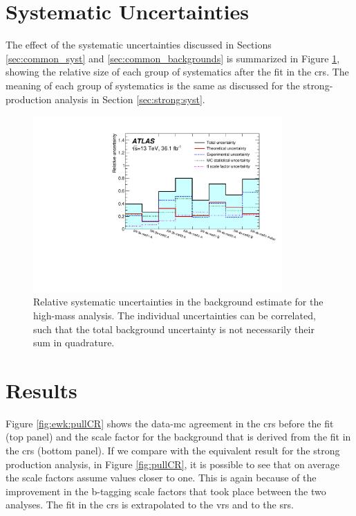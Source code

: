 \section{Systematic Uncertainties}

The effect of the systematic uncertainties discussed in Sections \ref{sec:common_syst} and \ref{sec:common_backgrounds} 
is summarized in Figure \ref{fig:syst_etmiss}, showing the relative size of each group of systematics after the fit in the 
\glspl{cr}. 
The meaning of each group of systematics is the same as discussed for the strong-production analysis in Section \ref{sec:strong:syst}.



\begin{figure}[htbp]
	\centering
	\includegraphics[width=0.85\textwidth]{figures/ewk_prod/etmiss_misc/High-MET-syst.pdf}
	\caption{Relative systematic uncertainties in the background estimate for the high-mass analysis. The individual uncertainties can be correlated, such that the total background uncertainty is not necessarily their sum in quadrature. 
	} 
	\label{fig:syst_etmiss}
\end{figure}

\section{Results}
\label{sec:ewk:results}

Figure \ref{fig:ewk:pullCR} shows the data-\gls{mc} agreement in the \glspl{cr} before the fit (top panel)
and the scale factor for the \ttbar background that is derived from the fit in the \glspl{cr} (bottom panel).
If we compare with the equivalent result for the strong production analysis, in Figure \ref{fig:pullCR}, it is possible 
to see that on average the \ttbar scale factors assume values closer to one. 
This is again because of the improvement in the b-tagging scale factors that took place between the two analyses. 
The fit in the \glspl{cr} is extrapolated to the \glspl{vr} and to the \glspl{sr}. 

